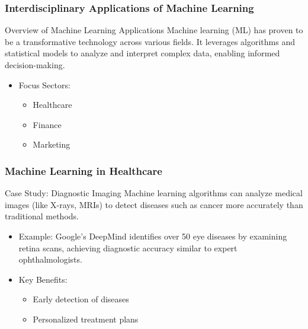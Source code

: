 \documentclass[aspectratio=169]{beamer}
\begin{document}
\begin{frame}[fragile]
    \frametitle{Interdisciplinary Applications of Machine Learning}
    \begin{block}{Overview of Machine Learning Applications}
        Machine learning (ML) has proven to be a transformative technology across various fields. It leverages algorithms and statistical models to analyze and interpret complex data, enabling informed decision-making. 
    \end{block}
    \begin{itemize}
        \item Focus Sectors:
            \begin{itemize}
                \item Healthcare
                \item Finance
                \item Marketing
            \end{itemize}
    \end{itemize}
\end{frame}

\begin{frame}[fragile]
    \frametitle{Machine Learning in Healthcare}
    \begin{block}{Case Study: Diagnostic Imaging}
        Machine learning algorithms can analyze medical images (like X-rays, MRIs) to detect diseases such as cancer more accurately than traditional methods. 
        \begin{itemize}
            \item Example: Google's DeepMind identifies over 50 eye diseases by examining retina scans, achieving diagnostic accuracy similar to expert ophthalmologists.
        \end{itemize}
    \end{block}
    \begin{itemize}
        \item Key Benefits:
            \begin{itemize}
                \item Early detection of diseases
                \item Personalized treatment plans
            \end{itemize}
    \end{itemize}
\end{frame}
\end{document}
